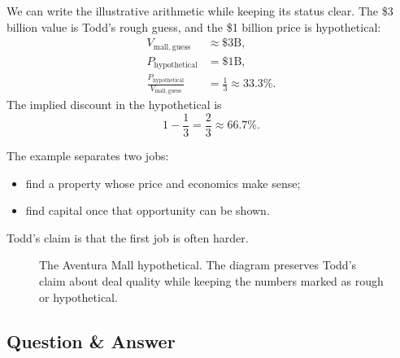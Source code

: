 We can write the illustrative arithmetic while keeping its status clear. The \$3 billion value is Todd's rough guess, and the \$1 billion price is hypothetical:
\begin{align}
V_{\mathrm{mall,guess}}&\approx \$3\mathrm{B},\\
P_{\mathrm{hypothetical}}&=\$1\mathrm{B},\\
\frac{P_{\mathrm{hypothetical}}}{V_{\mathrm{mall,guess}}}
&=
\frac{1}{3}
\approx 33.3\%.
\end{align}
The implied discount in the hypothetical is
\begin{equation}
1-\frac{1}{3}
=
\frac{2}{3}
\approx 66.7\%.
\end{equation}

The example separates two jobs:
\begin{itemize}
\item find a property whose price and economics make sense;
\item find capital once that opportunity can be shown.
\end{itemize}
Todd's claim is that the first job is often harder.

\begin{figure}
\centering
{}
\caption{The Aventura Mall hypothetical. The diagram preserves Todd's claim about deal quality while keeping the numbers marked as rough or hypothetical.}
\end{figure}

\subsection{Question \& Answer}

